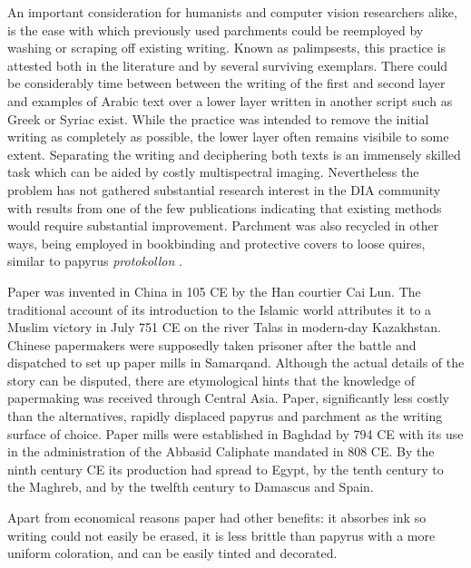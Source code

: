 An important consideration for humanists and computer vision researchers alike,
is the ease with which previously used parchments could be reemployed by
washing or scraping off existing writing. Known as palimpsests, this practice
is attested both in the literature and by several surviving exemplars. There
could be considerably time between between the writing of the first and second
layer and examples of Arabic text over a lower layer written in another script
such as Greek or Syriac exist\cite[pg. 43-46]{deroche2006islamic}. While the
practice was intended to remove the initial writing as completely as possible,
the lower layer often remains visibile to some extent. Separating the writing
and deciphering both texts is an immensely skilled task which can be aided by
costly multispectral imaging\cite{easton2003multispectral}. Nevertheless the
problem has not gathered substantial research interest in the DIA community
with results from one of the few publications \cite{starynska2017methods}
indicating that existing methods would require substantial improvement.
Parchment was also recycled in other ways, being employed in bookbinding and
protective covers to loose quires, similar to papyrus \emph{protokollon}
\cite[pg. 46]{deroche2006islamic}.

Paper was invented in China in 105 CE by the Han courtier Cai Lun. The
traditional account of its introduction to the Islamic world attributes it to a
Muslim victory in July 751 CE on the river Talas in modern-day Kazakhstan.
Chinese papermakers were supposedly taken prisoner after the battle and
dispatched to set up paper mills in Samarqand. Although the actual details of
the story can be disputed, there are etymological hints that the knowledge of
papermaking was received through Central Asia\cite[pg. 45]{blair2006islamic}.
Paper, significantly less costly than the alternatives, rapidly displaced
papyrus and parchment as the writing surface of choice. Paper mills were
established in Baghdad by 794 CE with its use in the administration of the
Abbasid Caliphate mandated in 808 CE. By the ninth century CE its production
had spread to Egypt, by the tenth century to the Maghreb, and by the twelfth
century to Damascus and Spain\cite[pg. 51]{deroche2006islamic}.

Apart from economical reasons paper had other benefits: it absorbes ink so
writing could not easily be erased\cite[pg. 45]{blair2006islamic}, it is less
brittle than papyrus with a more uniform coloration, and can be easily tinted
and decorated.

